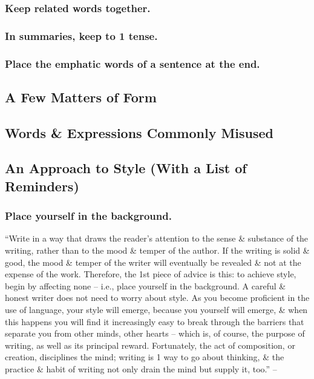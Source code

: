 \documentclass{article}
\begin{document}
\subsubsection{Keep related words together.}


\subsubsection{In summaries, keep to 1 tense.}


\subsubsection{Place the emphatic words of a sentence at the end.}


\subsection{A Few Matters of Form}


\subsection{Words \& Expressions Commonly Misused}


\subsection{An Approach to Style (With a List of Reminders)}

\subsubsection{Place yourself in the background.}
``Write in a way that draws the reader's attention to the sense \& substance of the writing, rather than to the mood \& temper of the author. If the writing is solid \& good, the mood \& temper of the writer will eventually be revealed \& not at the expense of the work. Therefore, the 1st piece of advice is this: to achieve style, begin by affecting none -- i.e., place yourself in the background. A careful \& honest writer does not need to worry about style. As you become proficient in the use of language, your style will emerge, because you yourself will emerge, \& when this happens you will find it increasingly easy to break through the barriers that separate you from other minds, other hearts -- which is, of course, the purpose of writing, as well as its principal reward. Fortunately, the act of composition, or creation, disciplines the mind; writing is 1 way to go about thinking, \& the practice \& habit of writing not only drain the mind but supply it, too.'' -- \cite[p. 78]{Strunk_White_element_style}
\end{document}
